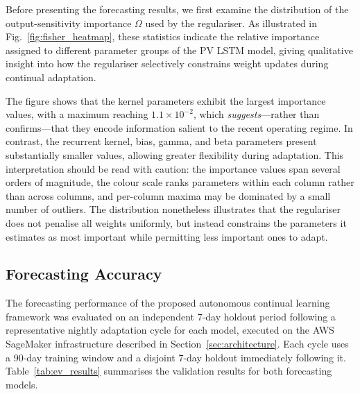 \documentclass[journal]{IEEEtran}
\begin{document}
Before presenting the forecasting results, we first examine the
distribution of the output-sensitivity importance $\Omega$ used by the
regulariser. As illustrated in Fig.~\ref{fig:fisher_heatmap}, these
statistics indicate the relative importance assigned to different
parameter groups of the PV LSTM model, giving qualitative insight into
how the regulariser selectively constrains weight updates during
continual adaptation.


The figure shows that the kernel parameters exhibit the largest
importance values, with a maximum reaching $1.1\times10^{-2}$, which
\emph{suggests}---rather than confirms---that they encode information
salient to the recent operating regime. In contrast, the recurrent
kernel, bias, gamma, and beta parameters present substantially smaller
values, allowing greater flexibility during adaptation. This
interpretation should be read with caution: the importance values span
several orders of magnitude, the colour scale ranks parameters within
each column rather than across columns, and per-column maxima may be
dominated by a small number of outliers. The distribution nonetheless
illustrates that the regulariser does not penalise all weights uniformly,
but instead constrains the parameters it estimates as most important
while permitting less important ones to adapt.

\subsection{Forecasting Accuracy}
\label{sec:results_forecasting}

The forecasting performance of the proposed autonomous continual
learning framework was evaluated on an independent 7-day holdout period
following a representative nightly adaptation cycle for each model,
executed on the AWS SageMaker infrastructure described in
Section~\ref{sec:architecture}. Each cycle uses a 90-day training window
and a disjoint 7-day holdout immediately following it.
Table~\ref{tab:ev_results} summarises the validation results for both
forecasting models.
\end{document}
